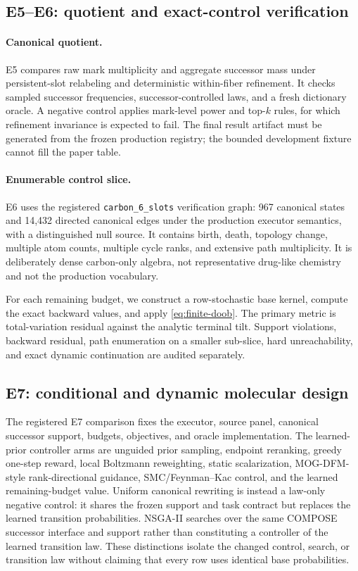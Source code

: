 \subsection{E5--E6: quotient and exact-control verification}

\paragraph{Canonical quotient.}
E5 compares raw mark multiplicity and aggregate successor mass under
persistent-slot relabeling and deterministic within-fiber refinement. It checks
sampled successor frequencies, successor-controlled laws, and a fresh
dictionary oracle. A negative control applies mark-level power and top-$k$
rules, for which refinement invariance is expected to fail. The final result
artifact must be generated from the frozen production registry; the bounded
development fixture cannot fill the paper table.

\paragraph{Enumerable control slice.}
E6 uses the registered \texttt{carbon\_6\_slots} verification graph: 967
canonical states and 14,432 directed canonical edges under the production
executor semantics, with a distinguished null source. It contains birth,
death, topology change, multiple atom counts, multiple cycle ranks, and
extensive path multiplicity. It is deliberately dense carbon-only algebra, not
representative drug-like chemistry and not the production vocabulary.

For each remaining budget, we construct a row-stochastic base kernel, compute
the exact backward values, and apply \eqref{eq:finite-doob}. The primary metric
is total-variation residual against the analytic terminal tilt. Support
violations, backward residual, path enumeration on a smaller sub-slice, hard
unreachability, and exact dynamic continuation are audited separately.

\subsection{E7: conditional and dynamic molecular design}

The registered E7 comparison fixes the executor, source panel, canonical
successor support, budgets, objectives, and oracle implementation. The
learned-prior controller arms are unguided prior sampling, endpoint reranking,
greedy one-step reward, local Boltzmann reweighting, static scalarization,
MOG-DFM-style rank-directional guidance, SMC/Feynman--Kac control, and the
learned remaining-budget value. Uniform canonical rewriting is instead a
law-only negative control: it shares the frozen support and task contract but
replaces the learned transition probabilities. NSGA-II searches over the same
COMPOSE successor interface and support rather than constituting a controller
of the learned transition law. These distinctions isolate the changed control,
search, or transition law without claiming that every row uses identical base
probabilities.

